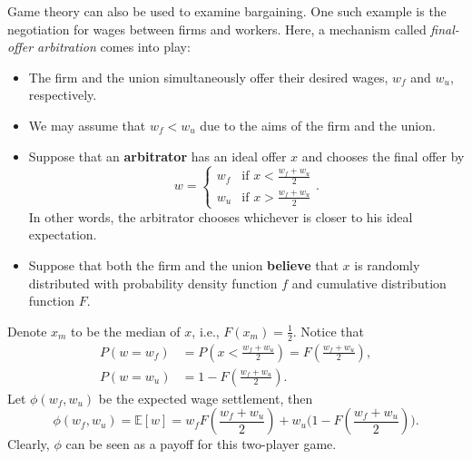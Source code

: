 \documentclass[math]{amznotes}
\theoremstyle{remark}
\begin{document}
Game theory can also be used to examine bargaining. One such example is the negotiation for wages between firms and workers. Here, a mechanism called \textit{final-offer arbitration} comes into play:
\begin{itemize}
    \item The firm and the union simultaneously offer their desired wages, $w_f$ and $w_u$, respectively. 
    \item We may assume that $w_f < w_u$ due to the aims of the firm and the union.
    \item Suppose that an \textbf{arbitrator} has an ideal offer $x$ and chooses the final offer by
    \begin{equation*}
        w = \begin{cases}
            w_f & \textrm{if } x < \frac{w_f + w_u}{2} \\
            w_u & \textrm{if } x > \frac{w_f + w_u}{2}
        \end{cases}.
    \end{equation*}
    In other words, the arbitrator chooses whichever is closer to his ideal expectation.
    \item Suppose that both the firm and the union \textbf{believe} that $x$ is randomly distributed with probability density function $f$ and cumulative distribution function $F$.
\end{itemize}
Denote $x_m$ to be the median of $x$, i.e., $F\left(x_m\right) = \frac{1}{2}$. Notice that 
\begin{align*}
    P\left(w = w_f\right) & = P\left(x < \frac{w_f + w_u}{2}\right) = F\left(\frac{w_f + w_u}{2}\right), \\
    P\left(w = w_u\right) & = 1 - F\left(\frac{w_f + w_u}{2}\right).
\end{align*}
Let $\phi\left(w_f, w_u\right)$ be the expected wage settlement, then 
\begin{equation*}
    \phi\left(w_f, w_u\right) = \mathbb{E}\left[w\right] = w_fF\left(\frac{w_f + w_u}{2}\right) + w_u\biggl(1 - F\left(\frac{w_f + w_u}{2}\right)\biggr).
\end{equation*}
Clearly, $\phi$ can be seen as a payoff for this two-player game.
\end{document}

